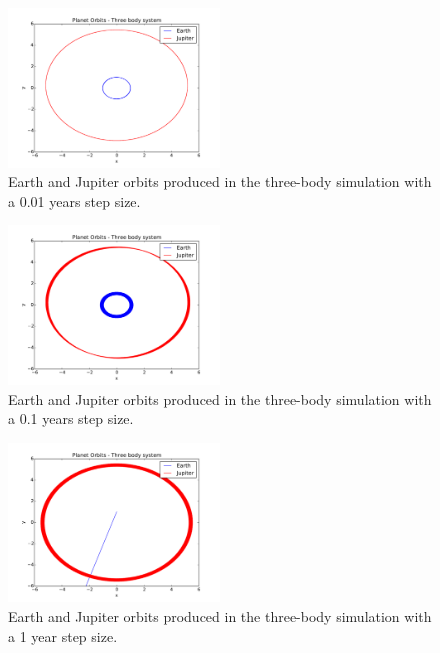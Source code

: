 \documentclass[10pt,showpacs,preprintnumbers,footinbib,amsmath,amssymb,aps,prl,twocolumn,groupedaddress,superscriptaddress,showkeys]{revtex4-1}
\begin{document}
\begin{figure}
\centering
	\includegraphics[width=0.5\textwidth]{figures/sej200.pdf}
	\caption{Earth and Jupiter orbits produced in the three-body
	simulation with a 0.01 years step size.}
	\label{fig:sej200}
\end{figure}

\begin{figure}
\centering
	\includegraphics[width=0.5\textwidth]{figures/sej2000.pdf}
	\caption{Earth and Jupiter orbits produced in the three-body
	simulation with a 0.1 years step size.}
	\label{fig:sej2000}
\end{figure}

\begin{figure}
\centering
	\includegraphics[width=0.5\textwidth]{figures/sej20000.pdf}
	\caption{Earth and Jupiter orbits produced in the three-body
	simulation with a 1 year step size.}
	\label{fig:sej20000}
\end{figure}

\clearpage
\end{document}
